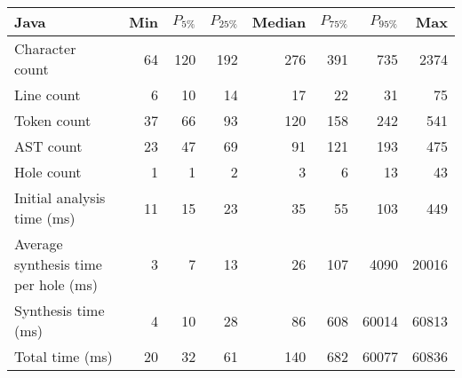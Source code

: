 \begin{tabular}{|l|r|r|r|r|r|r|r|}
  \hline
  Java & Min & $P_{5\%}$ & $P_{25\%}$ & Median & $P_{75\%}$ & $P_{95\%}$ & Max \\
  \hline
  \hline
  Character count & 64 & 120 & 192 & 276 & 391 & 735 & 2374 \\
  Line count & 6 & 10 & 14 & 17 & 22 & 31 & 75 \\
  Token count & 37 & 66 & 93 & 120 & 158 & 242 & 541 \\
  AST count & 23 & 47 & 69 & 91 & 121 & 193 & 475 \\
  Hole count & 1 & 1 & 2 & 3 & 6 & 13 & 43 \\
  \hline
  Initial analysis time (ms) & 11 & 15 & 23 & 35 & 55 & 103 & 449 \\
  Average synthesis time per hole (ms) & 3 & 7 & 13 & 26 & 107 & 4090 & 20016 \\
  Synthesis time (ms) & 4 & 10 & 28 & 86 & 608 & 60014 & 60813 \\
  Total time (ms) & 20 & 32 & 61 & 140 & 682 & 60077 & 60836 \\
  \hline
\end{tabular}